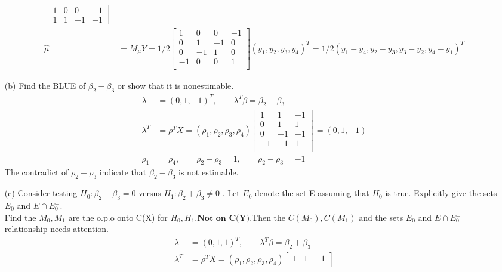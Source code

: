 \begin{itemize}
\begin{align*}
\begin{bmatrix}
           1 & 0 & 0 & -1    \\
           1 & 1 & -1 & -1
         \end{bmatrix}\\
       \hat{\mu} &= M_{\mu} Y =  1/2 \begin{bmatrix}
           1  & 0 & 0 & -1   \\
           0 &  1 & -1 & 0 \\
           0  & -1 & 1 & 0 \\
           -1 &  0 & 0 & 1 \\
         \end{bmatrix} (y_1, y_2, y_3, y_4)^T = 1/2 (y_1- y_4, y_2-y_3, y_3-y_2, y_4-y_1)^T
\end{align*}
\item[(b)] Find the BLUE of $\beta_2 - \beta_3$ or show that it is nonestimable.
\begin{align*}
    \lambda &= (0, 1,-1)^T, \qquad \lambda^T \beta = \beta_2 - \beta_3\\
    \lambda^T &= \rho^T X = (\rho_1, \rho_2, \rho_3, \rho_4)  \begin{bmatrix}
           1  & 1 & -1  \\
           0 &  1 & 1\\
           0  & -1 & -1  \\
           -1 &  -1 & 1\\
         \end{bmatrix} = (0, 1,-1)\\
         \rho_1 &= \rho_4, \qquad \rho_2 - \rho_3 = 1, \qquad \rho_2 - \rho_3 = -1
\end{align*}
The contradict of $\rho_2 - \rho_3$ indicate that  $\beta_2 - \beta_3$ is not estimable.
\item[(c)] Consider testing $H_0: \beta_2 + \beta_3 = 0$  versus $H_1: \beta_2 + \beta_3 \neq 0$ . Let $E_0$ denote the set E assuming that $H_0$ is true. Explicitly give the sets $E_0$ and $E \cap E_0^{\perp}$.\\
Find the $M_{0}, M_{1}$ are the o.p.o onto C(X) for $H_0, H_1$.$\textbf{Not on C(Y)}$.Then the $C(M_{0}), C(M_{1})$ and the sets $E_0$ and $E \cap E_0^{\perp}$ relationship needs attention.
\begin{align*}
    \lambda &= (0, 1, 1)^T, \qquad \lambda^T \beta = \beta_2 + \beta_3\\
    \lambda^T &= \rho^T X = (\rho_1, \rho_2, \rho_3, \rho_4)  \begin{bmatrix}
           1  & 1 & -1  \\

\end{bmatrix}
\end{align*}
\end{itemize}
